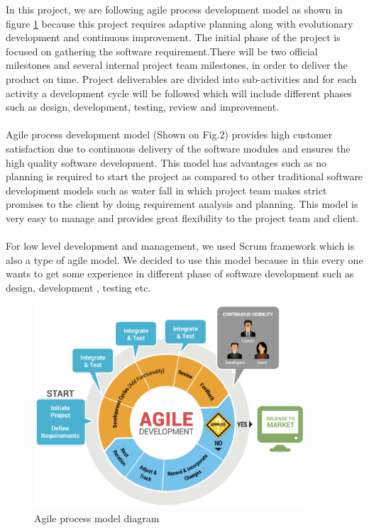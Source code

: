 In this project, we are following agile process development model as shown in figure \ref{fig:process_model} because this project requires adaptive planning along with evolutionary development and continuous improvement. The initial phase of the project is focused on gathering the software requirement.There will be two official milestones and several internal project team milestones, in order to deliver the product on time. Project deliverables are divided into sub-activities and for each activity a development cycle will be followed which will include different phases such as design, development, testing, review and improvement.
\paragraph{} Agile process development model (Shown on Fig.2) provides high customer satisfaction due to continuous delivery of the software modules and ensures the high quality software development. This model has advantages such as no planning is required to start the project as compared to other traditional software development models such as water fall in which project team makes strict promises to the client by doing requirement analysis and planning. This model is very easy to manage and provides great flexibility to the project team and client.

\paragraph{} For low level development and management, we used Scrum framework which is also a type of agile model. We decided to use this model because in this every one wants to get some experience in different phase of software development such as design, development , testing etc.

\begin{figure}
\centering
\includegraphics[width=0.9\textwidth]{process_model.png}
\caption{\label{fig:process_model}Agile process model diagram}
\end{figure}

